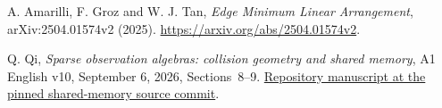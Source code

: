 A. Amarilli, F. Groz and W. J. Tan,
\emph{Edge Minimum Linear Arrangement}, arXiv:2504.01574v2 (2025).
\url{https://arxiv.org/abs/2504.01574v2}.

Q. Qi, \emph{Sparse observation algebras: collision geometry and shared
memory}, A1 English v10, September 6, 2026, Sections~8--9.
\href{https://github.com/TrillionniumFoundation/theta-theory/tree/da5abea9f40244879115d5fbcfbda375bc9a123e/papers/A1-english-v10}{Repository manuscript at the pinned shared-memory source commit}.

